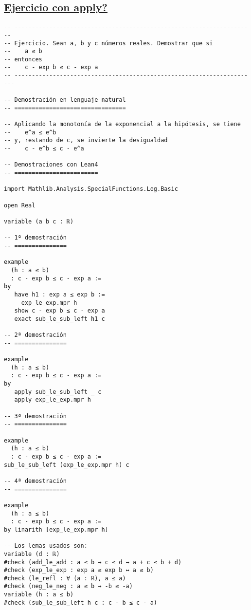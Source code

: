 \subsection{\href{./src/Basicos/Ejercicio\_con\_library\_search.lean}{Ejercicio con apply?}}
\label{sec:org771845a}
\begin{verbatim}
-- ---------------------------------------------------------------------
-- Ejercicio. Sean a, b y c números reales. Demostrar que si
--    a ≤ b
-- entonces
--    c - exp b ≤ c - exp a
-- ----------------------------------------------------------------------

-- Demostración en lenguaje natural
-- ================================

-- Aplicando la monotonía de la exponencial a la hipótesis, se tiene
--    e^a ≤ e^b
-- y, restando de c, se invierte la desigualdad
--    c - e^b ≤ c - e^a

-- Demostraciones con Lean4
-- ========================

import Mathlib.Analysis.SpecialFunctions.Log.Basic

open Real

variable (a b c : ℝ)

-- 1ª demostración
-- ===============

example
  (h : a ≤ b)
  : c - exp b ≤ c - exp a :=
by
   have h1 : exp a ≤ exp b :=
     exp_le_exp.mpr h
   show c - exp b ≤ c - exp a
   exact sub_le_sub_left h1 c

-- 2ª demostración
-- ===============

example
  (h : a ≤ b)
  : c - exp b ≤ c - exp a :=
by
   apply sub_le_sub_left _ c
   apply exp_le_exp.mpr h

-- 3ª demostración
-- ===============

example
  (h : a ≤ b)
  : c - exp b ≤ c - exp a :=
sub_le_sub_left (exp_le_exp.mpr h) c

-- 4ª demostración
-- ===============

example
  (h : a ≤ b)
  : c - exp b ≤ c - exp a :=
by linarith [exp_le_exp.mpr h]

-- Los lemas usados son:
variable (d : ℝ)
#check (add_le_add : a ≤ b → c ≤ d → a + c ≤ b + d)
#check (exp_le_exp : exp a ≤ exp b ↔ a ≤ b)
#check (le_refl : ∀ (a : ℝ), a ≤ a)
#check (neg_le_neg : a ≤ b → -b ≤ -a)
variable (h : a ≤ b)
#check (sub_le_sub_left h c : c - b ≤ c - a)
\end{verbatim}

